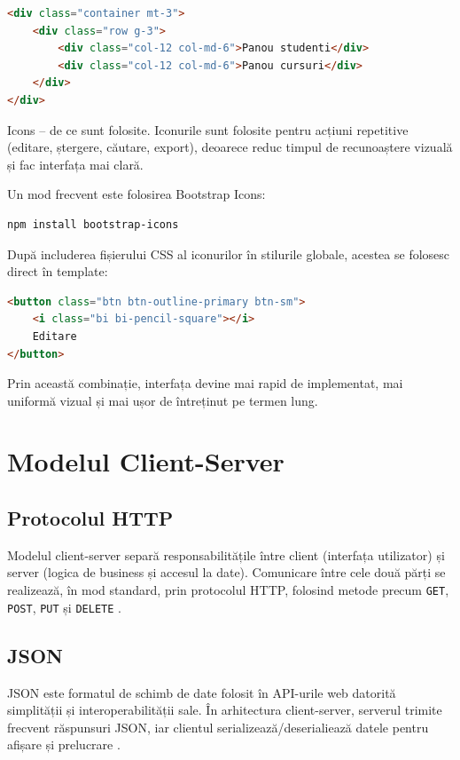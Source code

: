\begin{lstlisting}[language=HTML]
<div class="container mt-3">
	<div class="row g-3">
		<div class="col-12 col-md-6">Panou studenti</div>
		<div class="col-12 col-md-6">Panou cursuri</div>
	</div>
</div>
\end{lstlisting}

Icons -- de ce sunt folosite. Iconurile sunt folosite pentru acțiuni repetitive (editare, ștergere, căutare, export), deoarece reduc timpul de recunoaștere vizuală și fac interfața mai clară.

Un mod frecvent este folosirea Bootstrap Icons:

\begin{lstlisting}[language=bash]
npm install bootstrap-icons
\end{lstlisting}

După includerea fișierului CSS al iconurilor în stilurile globale, acestea se folosesc direct în template:

\begin{lstlisting}[language=HTML]
<button class="btn btn-outline-primary btn-sm">
	<i class="bi bi-pencil-square"></i>
	Editare
</button>
\end{lstlisting}

Prin această combinație, interfața devine mai rapid de implementat, mai uniformă vizual și mai ușor de întreținut pe termen lung.

\section{Modelul Client-Server}

\subsection{Protocolul HTTP}
Modelul client-server separă responsabilitățile între client (interfața utilizator) și server (logica de business și accesul la date). Comunicare între cele două părți se realizează, în mod standard, prin protocolul HTTP, folosind metode precum \texttt{GET}, \texttt{POST}, \texttt{PUT} și \texttt{DELETE} \cite{sciencedirect_client_server_2026,mdn_http_2026}.

\subsection{JSON}
JSON este formatul de schimb de date folosit în API-urile web datorită simplității și interoperabilității sale. În arhitectura client-server, serverul trimite frecvent răspunsuri JSON, iar clientul serializează/deserialiează datele pentru afișare și prelucrare \cite{json_org_2026}.

